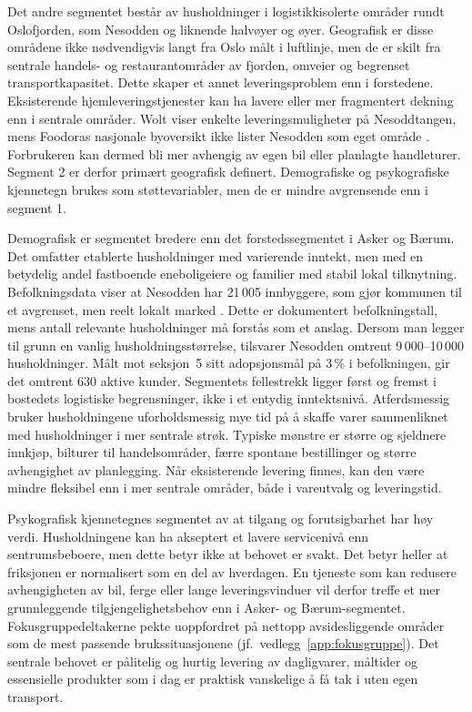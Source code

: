 Det andre segmentet består av husholdninger i logistikkisolerte områder
rundt Oslofjorden, som Nesodden og liknende halvøyer og øyer.
Geografisk er disse områdene ikke nødvendigvis langt fra Oslo målt i luftlinje,
men de er skilt fra sentrale handels- og restaurantområder av fjorden,
omveier og begrenset transportkapasitet. Dette skaper et annet
leveringsproblem enn i forstedene. Eksisterende
hjemleveringstjenester kan ha lavere eller mer fragmentert dekning enn i
sentrale områder. Wolt viser enkelte leveringsmuligheter på Nesoddtangen,
mens Foodoras nasjonale byoversikt ikke lister Nesodden som eget område
\parencite{wolt2026_nesoddtangen, foodora2026_byer}. Forbrukeren kan dermed
bli mer avhengig av egen bil eller planlagte handleturer. Segment 2 er derfor
primært geografisk definert. Demografiske og psykografiske kjennetegn brukes
som støttevariabler, men de er mindre avgrensende enn i segment 1.

Demografisk er segmentet bredere enn det forstedssegmentet i Asker og Bærum.
Det omfatter etablerte husholdninger med varierende inntekt, men med en
betydelig andel fastboende eneboligeiere og familier med stabil lokal
tilknytning. Befolkningsdata viser at Nesodden har 21\,005 innbyggere, som
gjør kommunen til et avgrenset, men reelt lokalt marked
\parencite{ssb2026_befolkning}. Dette er dokumentert befolkningstall, mens
antall relevante husholdninger må forstås som et anslag. Dersom man legger
til grunn en vanlig husholdningsstørrelse, tilsvarer Nesodden omtrent
9\,000--10\,000 husholdninger. Målt mot seksjon~5 sitt adopsjonsmål på
3\,\% i befolkningen, gir det omtrent 630 aktive kunder.
Segmentets fellestrekk ligger først og fremst i bostedets logistiske
begrensninger, ikke i et entydig inntektsnivå.
Atferdsmessig bruker husholdningene uforholdsmessig mye tid på
å skaffe varer sammenliknet med husholdninger i mer sentrale strøk. Typiske
mønstre er større og sjeldnere innkjøp, bilturer til handelsområder, færre
spontane bestillinger og større avhengighet av planlegging. Når eksisterende
levering finnes, kan den være mindre fleksibel enn i mer sentrale områder,
både i vareutvalg og leveringstid.

Psykografisk kjennetegnes segmentet av at tilgang og forutsigbarhet har høy
verdi. Husholdningene kan ha akseptert et lavere servicenivå enn
sentrumsbeboere, men dette betyr ikke at behovet er svakt. Det betyr heller
at friksjonen er normalisert som en del av hverdagen. En tjeneste som kan
redusere avhengigheten av bil, ferge eller lange leveringsvinduer vil derfor
treffe et mer grunnleggende tilgjengelighetsbehov enn i Asker- og
Bærum-segmentet. Fokusgruppedeltakerne pekte uoppfordret på nettopp
avsidesliggende områder som de mest passende brukssituasjonene
(jf.\ vedlegg~\ref{app:fokusgruppe}).
Det sentrale behovet er pålitelig og hurtig levering av dagligvarer, måltider
og essensielle produkter som i dag er praktisk vanskelige å få tak i uten
egen transport.

